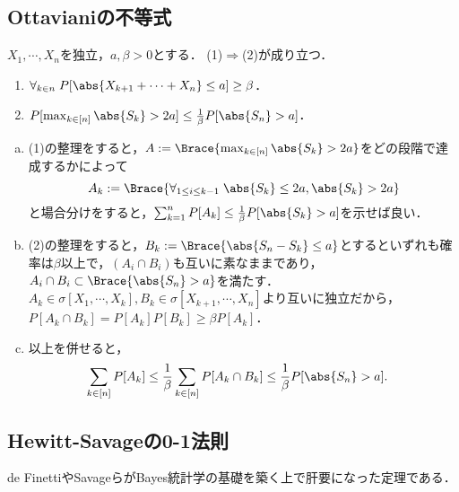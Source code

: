 \documentclass[uplatex,dvipdfmx]{jsreport}
\begin{document}
\subsection{Ottavianiの不等式}

\begin{theorem}
    $X_1,\cdots,X_n$を独立，$a,\beta>0$とする．
    (1)$\Rightarrow$(2)が成り立つ．
    \begin{enumerate}
        \item $\forall_{k\in n}\;P[\abs{X_{k+1}+\cdots+X_n}\le a]\ge\beta$．
        \item $P[\max_{k\in[n]}\abs{S_k}>2a]\le\frac{1}{\beta}P[\abs{S_n}>a]$．
    \end{enumerate}
\end{theorem}
\begin{Proof}\mbox{}
    \begin{enumerate}[(a)]
        \item (1)の整理をすると，$A:=\Brace{\max_{k\in[n]}\abs{S_k}>2a}$をどの段階で達成するかによって
        \[A_k:=\Brace{\forall_{1\le i\le k-1}\;\abs{S_k}\le 2a,\abs{S_k}>2a}\]
        と場合分けをすると，$\sum^n_{k=1}P[A_k]\le\frac{1}{\beta}P[\abs{S_k}>a]$を示せば良い．
        \item (2)の整理をすると，$B_k:=\Brace{\abs{S_n-S_k}\le a}$とするといずれも確率は$\beta$以上で，$(A_i\cap B_i)$も互いに素なままであり，$A_i\cap B_i\subset\Brace{\abs{S_n}>a}$を満たす．
        $A_k\in\sigma[X_1,\cdots,X_k],B_k\in\sigma[X_{k+1},\cdots,X_n]$より互いに独立だから，$P[A_k\cap B_k]=P[A_k]P[B_k]\ge\beta P[A_k]$．
        \item 以上を併せると，
        \begin{align*}
            \sum_{k\in[n]}P[A_k]&\le\frac{1}{\beta}\sum_{k\in[n]}P[A_k\cap B_k]\le\frac{1}{\beta}P[\abs{S_n}>a].
        \end{align*}
    \end{enumerate}
\end{Proof}

\subsection{Hewitt-Savageの0-1法則}

\begin{tcolorbox}[colframe=ForestGreen, colback=ForestGreen!10!white,breakable,colbacktitle=ForestGreen!40!white,coltitle=black,fonttitle=\bfseries\sffamily,
title=]
    de FinettiやSavageらがBayes統計学の基礎を築く上で肝要になった定理である．
\end{tcolorbox}
\end{document}
